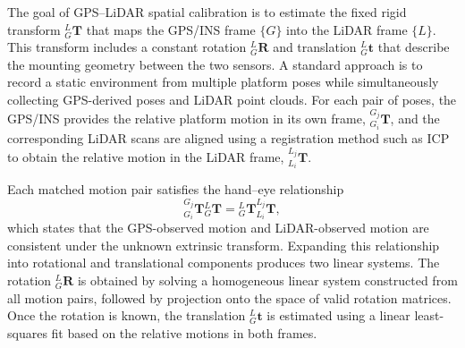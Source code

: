 \documentclass{erauthesis}
\begin{document}
The goal of GPS–LiDAR spatial calibration is to estimate the fixed rigid transform ${}_{G}^{L}\mathbf{T}$ that maps the GPS/INS frame $\{G\}$ into the LiDAR frame $\{L\}$. This transform includes a constant rotation ${}_{G}^{L}\mathbf{R}$ and translation ${}_{G}^{L}\mathbf{t}$ that describe the mounting geometry between the two sensors. A standard approach is to record a static environment from multiple platform poses while simultaneously collecting GPS-derived poses and LiDAR point clouds. For each pair of poses, the GPS/INS provides the relative platform motion in its own frame,
${}_{G_i}^{G_j}\mathbf{T}$,
and the corresponding LiDAR scans are aligned using a registration method such as \ac{ICP} to obtain the relative motion in the LiDAR frame,
${}_{L_i}^{L_j}\mathbf{T}$.

Each matched motion pair satisfies the hand–eye relationship
\begin{equation}
    {}_{G_i}^{G_j}\mathbf{T} {}_{G}^{L}\mathbf{T}
    =
    {}_{G}^{L}\mathbf{T} {}_{L_i}^{L_j}\mathbf{T},
\end{equation}
which states that the GPS-observed motion and LiDAR-observed motion are consistent under the unknown extrinsic transform. Expanding this relationship into rotational and translational components produces two linear systems. The rotation ${}_{G}^{L}\mathbf{R}$ is obtained by solving a homogeneous linear system constructed from all motion pairs, followed by projection onto the space of valid rotation matrices. Once the rotation is known, the translation ${}_{G}^{L}\mathbf{t}$ is estimated using a linear least-squares fit based on the relative motions in both frames.

\end{document}
